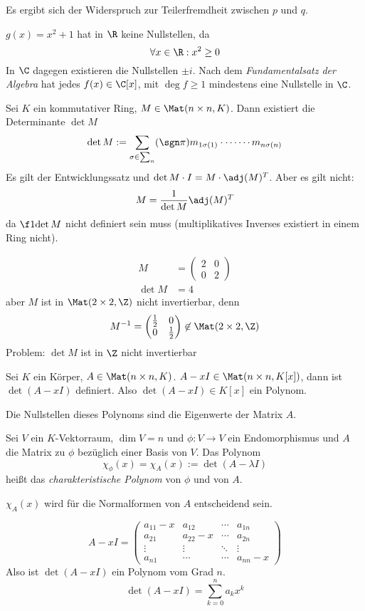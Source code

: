 \documentclass{mycourse}
\begin{document}
Es ergibt sich der Widerspruch zur Teilerfremdheit zwischen $p$ und $q$.

$g(x)=x^2+1$ hat in $\R$ keine Nullstellen, da
\[
\forall x\in\R:x^2\ge 0
\]
In $\C$ dagegen existieren die Nullstellen $\pm i$.
Nach dem \emph{Fundamentalsatz der Algebra} hat jedes $f(x)\in \C[x]$, mit $\deg f\ge 1$ mindestens eine Nullstelle in $\C$.

Sei $K$ ein kommutativer Ring, $M\in \Mat(n\times n, K)$.
Dann existiert die Determinante $\det M$
\[
\det M := \sum_{\sigma\in\sum_n}(\sgn\pi)m_{1\sigma(1)}\cdot\dotsb\cdots m_{n\sigma(n)}
\]
Es gilt der Entwicklungssatz und $\det M \cdot I = M\cdot \adj(M)^T$.
Aber es gilt nicht:
\[
M=\frac 1{\det M}\adj(M)^T
\]
da $\f 1{\det M}$ nicht definiert sein muss (multiplikatives Inverses existiert in einem Ring nicht).

\begin{ex}
\begin{align*}
M&=\begin{pmatrix}2&0\\0&2\end{pmatrix}\\
\det M&=4
\end{align*}
aber $M$ ist in $\Mat(2\times 2,\Z)$ nicht invertierbar, denn
\[
M^{-1} =\begin{pmatrix}\frac 12&0\\0&\frac 12\end{pmatrix} \not\in \Mat(2\times 2,\Z)
\]
Problem: $\det M$ ist in $\Z$ nicht invertierbar
\end{ex}

Sei $K$ ein Körper, $A\in \Mat(n\times n, K)$. $A-xI \in \Mat(n\times n,K[x])$, dann ist
$\det(A-xI)$ definiert.
Also $\det(A-xI)\in K[x]$ ein Polynom.

Die Nullstellen dieses Polynoms sind die Eigenwerte der Matrix $A$.

\begin{df}
\label{df:10.16}
Sei $V$ ein $K$-Vektorraum, $\dim V=n$ und $\phi:V\to V$ ein Endomorphismus und $A$ die Matrix zu $\phi$ bezüglich einer Basis von $V$.
Das Polynom
\[
\chi_{\phi}(x) = \chi_{A}(x) := \det(A-\lambda I)
\]
heißt das \emph{charakteristische Polynom} von $\phi$ und von $A$.
\end{df}

$\chi_A(x)$ wird für die Normalformen von $A$ entscheidend sein.

\[
A-xI = \begin{pmatrix}
a_{11}-x & a_{12} &\cdots & a_{1n}\\
a_{21}& a_{22}-x & \cdots & a_{2n}\\
\vdots & \vdots & \ddots & \vdots \\
a_{n1}&\cdots &\cdots & a_{nn}-x
\end{pmatrix}
\]
Also ist $\det(A-xI)$ ein Polynom vom Grad $n$.
\[
\det(A-xI)=\sum_{k=0}^na_kx^k
\]
\end{document}

